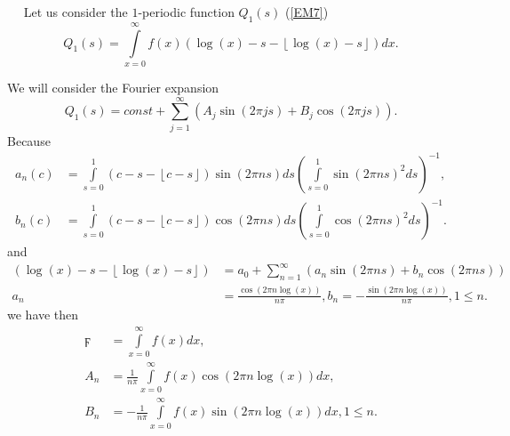 \documentclass[titlepage,fleqn]{article}%
\begin{document}
\
\label{FourieExpan}%
\ Let us consider the $1$-periodic function $Q_{1}(s)$ (\ref{EM7})
\begin{equation}
Q_{1}(s)=%
{\displaystyle\int\limits_{x=0}^{\infty}}
f(x)\left(  \log\left(  x\right)  -s-\left\lfloor \log\left(  x\right)
-s\right\rfloor \right)  dx. \label{Fouri1}%
\end{equation}


We will consider the Fourier expansion%
\[
Q_{1}(s)=const+%
{\displaystyle\sum\limits_{j=1}^{\infty}}
\left(  A_{j}\sin\left(  2\pi js\right)  +B_{j}\cos\left(  2\pi js\right)
\right)  .
\]
Because%
\begin{align*}
a_{n}(c)  &  =%
{\displaystyle\int\limits_{s=0}^{1}}
\left(  c-s-\left\lfloor c-s\right\rfloor \right)  \sin\left(  2\pi ns\right)
ds\left(
{\displaystyle\int\limits_{s=0}^{1}}
\sin\left(  2\pi ns\right)  ^{2}ds\right)  ^{-1},\\
b_{n}(c)  &  =%
{\displaystyle\int\limits_{s=0}^{1}}
\left(  c-s-\left\lfloor c-s\right\rfloor \right)  \cos\left(  2\pi ns\right)
ds\left(
{\displaystyle\int\limits_{s=0}^{1}}
\cos\left(  2\pi ns\right)  ^{2}ds\right)  ^{-1}.
\end{align*}
and%
\begin{align*}
\left(  \log\left(  x\right)  -s-\left\lfloor \log\left(  x\right)
-s\right\rfloor \right)   &  =a_{0}+%
{\displaystyle\sum\limits_{n=1}^{\infty}}
\left(  a_{n}\sin\left(  2\pi ns\right)  +b_{n}\cos\left(  2\pi ns\right)
\right) \\
a_{n}  &  =\frac{\cos(2\pi n\log\left(  x\right)  )}{n\pi},b_{n}=-\frac
{\sin(2\pi n\log\left(  x\right)  )}{n\pi},1\leq n.
\end{align*}
we have then%
\begin{align}
\digamma &  =%
{\displaystyle\int\limits_{x=0}^{\infty}}
f(x)dx,\label{Fouri2}\\
A_{n}  &  =\frac{1}{n\pi}%
{\displaystyle\int\limits_{x=0}^{\infty}}
f(x)\cos(2\pi n\log\left(  x\right)  )dx,\\
B_{n}  &  =-\frac{1}{n\pi}%
{\displaystyle\int\limits_{x=0}^{\infty}}
f(x)\sin(2\pi n\log\left(  x\right)  )dx,1\leq n.\nonumber
\end{align}
\end{document}

